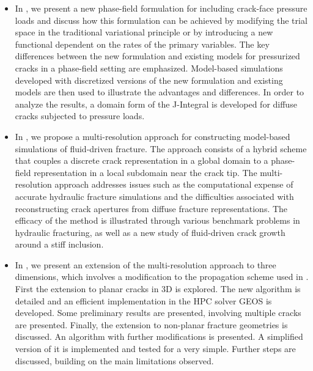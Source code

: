 \begin{itemize}
  \item %
        In , we present a new phase-field formulation for including crack-face pressure loads and discuss how this formulation can be achieved by modifying the trial space in the traditional variational principle or by introducing a new functional dependent on the rates of the primary variables. The key differences between the new formulation and existing models for pressurized cracks in a phase-field setting are emphasized. Model-based simulations developed with discretized versions of the new formulation and existing models are then used to illustrate the advantages and differences. In order to analyze the results, a domain form of the J-Integral is developed for diffuse cracks subjected to pressure loads.
  \item %
        In , we propose a multi-resolution approach for constructing model-based simulations of fluid-driven fracture. The approach consists of a hybrid scheme that couples a discrete crack representation in a global domain to a phase-field representation in a local subdomain near the crack tip. The multi-resolution approach addresses issues such as the computational expense of accurate hydraulic fracture simulations and the difficulties associated with reconstructing crack apertures from diffuse fracture representations. The efficacy of the method is illustrated through various benchmark problems in hydraulic fracturing, as well as a new study of fluid-driven crack growth around a stiff inclusion.
  \item %
        In , we present an extension of the multi-resolution approach to three dimensions, which involves a modification to the propagation scheme used in . First the extension to planar cracks in 3D is explored. The new algorithm is detailed and an efficient implementation in the HPC solver GEOS is developed. Some preliminary results are presented, involving multiple cracks are presented. Finally, the extension to non-planar fracture geometries is discussed. An algorithm with further modifications is presented. A simplified version of it is implemented and tested for a very simple. Further steps are discussed, building on the main limitations observed. 

\end{itemize}
